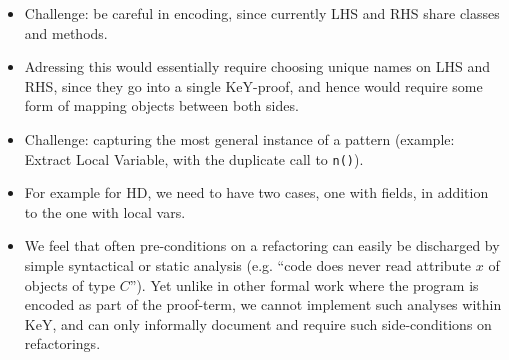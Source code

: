 \begin{itemize}
\item Challenge: be careful in encoding, since currently LHS and RHS share classes and methods.
\item Adressing this would essentially require choosing unique names on LHS and RHS, since they go into a single KeY-proof, and hence would require some form of mapping objects between both sides.
\item Challenge: capturing the most general instance of a pattern (example: Extract Local Variable, with the duplicate call to \texttt{n()}).
\item For example for HD, we need to have two cases, one with fields, in addition to the one with local vars.
\item We feel that often pre-conditions on a refactoring can easily be discharged by simple syntactical or static analysis (e.g. ``code does never read attribute $x$ of objects of type $C$'').
Yet unlike in other formal work where the program is encoded as part of the proof-term, we cannot implement such analyses within KeY, and can only informally document and require such side-conditions on refactorings.
\end{itemize}


